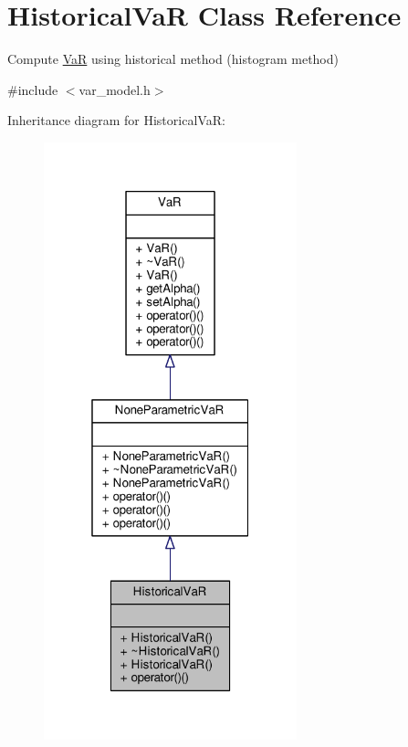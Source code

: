 \hypertarget{classHistoricalVaR}{}\section{Historical\+VaR Class Reference}
\label{classHistoricalVaR}


Compute \hyperlink{classVaR}{VaR} using historical method (histogram method)  




{\ttfamily \#include $<$var\+\_\+model.\+h$>$}



Inheritance diagram for Historical\+VaR\+:
\nopagebreak
\begin{figure}[H]
\begin{center}
\leavevmode
\includegraphics[width=208pt]{classHistoricalVaR__inherit__graph}
\end{center}
\end{figure}


